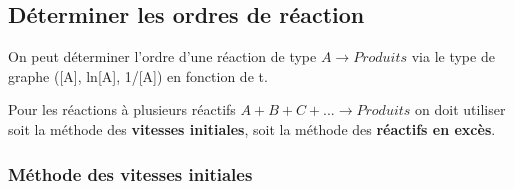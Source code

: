 \documentclass[10pt,a4paper]{book}
\begin{document}
\subsection{Déterminer les ordres de réaction}

On peut déterminer l'ordre d'une réaction de type \(A \rightarrow Produits\) via le type de graphe ([A], ln[A], 1/[A]) en fonction de t. \par
Pour les réactions à plusieurs réactifs \(A + B + C + ... \rightarrow Produits\) on doit utiliser soit la méthode des \textbf{vitesses initiales}, soit la méthode des \textbf{réactifs en excès}.

\subsubsection{Méthode des vitesses initiales}
\end{document}
